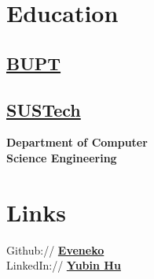 \documentclass[]{resume}
\begin{document}
%
%
\lastupdated

%
%

%
%

\begin{minipage}[t]{0.33\textwidth} 


\section{Education} 

\subsection{\href{https://www.bupt.edu.cn/}{BUPT}}
\sectionsep

\subsection{\href{https://www.sustech.edu.cn/}{SUSTech}}
\textbf{Department of Computer \\
Science Engineering \\}
\sectionsep


\section{Links} 
Github:// \href{https://github.com/Eveneko}{\bf Eveneko} \\
LinkedIn://  \href{https://www.linkedin.com/in/yubin-hu-7855861a0}{\bf Yubin Hu}
\sectionsep



\end{minipage}
\end{document}
